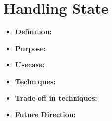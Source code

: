 \section{Handling State}
\label{sec:state}

\begin{itemize}
	\item \textbf{Definition: } 
	\item \textbf{Purpose: } 
	\item \textbf{Usecase:}
	\item \textbf{Techniques: }
	\item \textbf{Trade-off in techniques: } 
	\item \textbf{Future Direction:} 
\end{itemize}